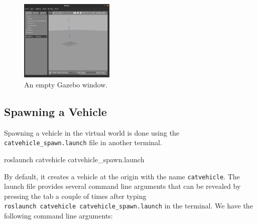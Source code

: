 \documentclass[
]{article}
\newenvironment{Shaded}{\begin{snugshade}}{\end{snugshade}}
\newcommand{\ExtensionTok}[1]{#1}
\newcommand{\NormalTok}[1]{#1}
\begin{document}
\begin{figure}[htbp]
\centering
\includegraphics[width=0.4\textwidth]{Gazebo_002.png}
\caption{An empty Gazebo window.}
\label{fig:Gazebo_002.png}
\end{figure}

\hypertarget{spawning-a-vehicle}{%
\subsection{Spawning a Vehicle}\label{spawning-a-vehicle}}

Spawning a vehicle in the virtual world is done using the
\texttt{catvehicle\_spawn.launch} file in another terminal.

\begin{Shaded}
\begin{Highlighting}[]
\ExtensionTok{roslaunch}\NormalTok{ catvehicle catvehicle\_spawn.launch}
\end{Highlighting}
\end{Shaded}

By default, it creates a vehicle at the origin with the name
\texttt{catvehicle}. The launch file provides several command line
arguments that can be revealed by pressing the tab a couple of times
after typing \texttt{roslaunch\ catvehicle\ catvehicle\_spawn.launch} in
the terminal. We have the following command line arguments:
\end{document}
